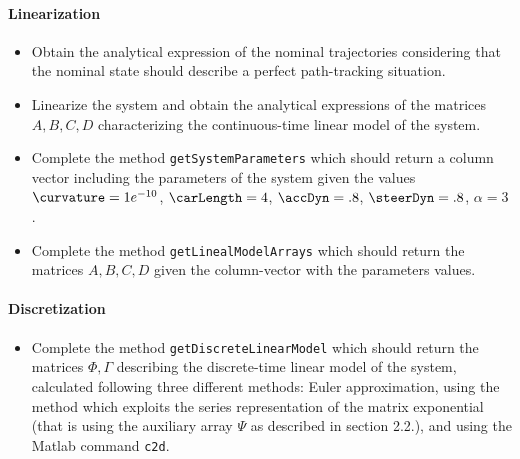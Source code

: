 \paragraph{Linearization}
	\begin{itemize}
		\setlength\itemsep{0em}
		\item Obtain the analytical expression of the nominal trajectories considering that the nominal state should describe a perfect path-tracking situation.
		\item Linearize the system and obtain the analytical expressions of the matrices $A,B,C,D$ characterizing the continuous-time linear model of the system.
		\item Complete the method \texttt{getSystemParameters} which should return a column vector including the parameters of the system given the values %
		$\curvature = 1e^{-10}$, %
		$\carLength = 4$, %
		$\accDyn = .8$, %
		$\steerDyn = .8$, %
		$\alpha = 3$.
		\item Complete the method \texttt{getLinealModelArrays} which should return the matrices $A,B,C,D$ given the column-vector with the parameters values. 
	\end{itemize}
\paragraph{Discretization}	
	\begin{itemize}
		\setlength\itemsep{0em}
		\item Complete the method \texttt{getDiscreteLinearModel} which should return the matrices $\Phi, \Gamma$ describing the discrete-time linear model of the system, calculated following three different methods: Euler approximation, using the method which exploits the series representation of the matrix exponential (that is using the auxiliary array $\Psi$ as described in section 2.2.), and using the Matlab command \texttt{c2d}.
	\end{itemize}
